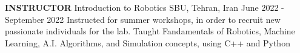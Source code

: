 \begin{cventries}
    \cventry
    {\textbf{INSTRUCTOR}}
    {Introduction to Robotics}
    {SBU, Tehran, Iran}
    {June 2022 - September 2022}
    {Instructed for summer workshops, in order to recruit new passionate individuals for the lab.
    \newline Taught Fandamentals of Robotics, Machine Learning, A.I. Algorithms, and Simulation concepts, using C++ and Python}
    \vspace{0.4 cm}
\end{cventries}

